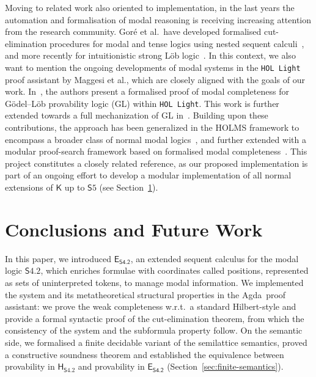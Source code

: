 \documentclass{article}
\newcommand{\logic}{\mathsf{S4.2}}
\newcommand{\axname}[1]{\mathsf{#1}}
\newcommand{\eseq}{\mathsf{E}_{{\textsf{S4.2}}}}
\newcommand{\agda}{\textsf{Agda}}
\newcommand{\hilbertlogic}[1]{\mathsf{H}_{#1}}
\theoremstyle{definition}
\begin{document}
Moving to related work also oriented to implementation, in the last years the automation and formalisation of modal reasoning is receiving increasing attention from the research community.
Gor\'{e} et al.\ have developed formalised cut-elimination procedures for modal and tense logics using nested sequent calculi~\cite{Gore2021:FormalVerifiedLinearNested,Gore2021:CutElimProvabilityCoq}, and more recently for intuitionistic strong L\"{o}b logic~\cite{Gore23}.
In this context, we also want to mention the ongoing developments of modal systems in the \texttt{HOL Light} proof assistant by Maggesi et al., which are closely aligned with the goals of our work.
In~\cite{Maggesi2021:ProvabilityLogic}, the authors present a formalised proof of modal completeness for G\"odel–L\"ob provability logic (GL) within \texttt{HOL Light}.
This work is further extended towards a full mechanization of GL in~\cite{Maggesi2023:GodelLob}.
Building upon these contributions, the approach has been generalized in the \textsf{HOLMS} framework to encompass a broader class of normal modal logics~\cite{Bilotta2024:GrowingHOLMS}, and further extended with a modular proof-search framework based on formalised modal completeness~\cite{Bilotta2026:ModularHOLMS}.
This project constitutes a closely related reference, as our proposed implementation is part of an ongoing effort to develop a modular implementation of all normal extensions of $\mathsf{K}$ up to $\axname{S}5$ (see Section~\ref{sec:conclusions_future}).


\section{Conclusions and Future Work}\label{sec:conclusions_future}

\newcommand{\framework}{\mathsf{NAMOR}}

In this paper, we introduced $\mathsf{E}_{\textsf{S4.2}}$, an extended sequent calculus for the modal logic $\logic$, which enriches formulae with coordinates called positions, represented as sets of uninterpreted tokens, to manage modal information. We implemented the system and its metatheoretical structural properties in the \agda{}~proof assistant: we prove the weak completeness w.r.t.\ a standard Hilbert-style and provide a formal syntactic proof of the cut-elimination theorem, from which the consistency of the system and the subformula property follow.
On the semantic side, we formalised a finite decidable variant of the semilattice semantics, proved a constructive soundness theorem and established the equivalence between provability in $\hilbertlogic{\logic}$ and provability in $\eseq$ (Section~\ref{sec:finite-semantics}).
\end{document}
